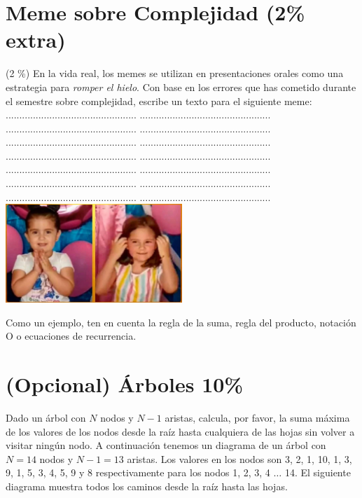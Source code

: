 \documentclass[10 pt]{article}
\begin{document}
\section{Meme sobre Complejidad (2\% extra)}
 (2 \%)  En la vida real, los memes se utilizan en presentaciones orales como una estrategia para \textit{romper el hielo}. Con base en los errores que has cometido durante el semestre sobre complejidad, 
escribe un texto para el siguiente meme:\\
................................................     ................................................\\
................................................     ................................................\\
................................................     ................................................\\
................................................     ................................................\\
................................................     ................................................\\
................................................     ................................................\\
................................................     ................................................\\
\includegraphics[width=0.5\textwidth]{Meme.jpg}


Como un ejemplo, ten en cuenta la regla de la suma, regla del producto,
notación O o ecuaciones de recurrencia.



\newpage


\section{(Opcional) Árboles 10\%}

Dado un árbol con $N$ nodos y $N-1$ aristas, calcula, por favor, la suma máxima de los valores de los nodos desde la raíz hasta cualquiera de las hojas sin volver a visitar ningún nodo. A continuación tenemos un diagrama de un árbol con $N=14$ nodos y $N-1=13$ aristas. Los valores en los nodos son 3, 2, 1, 10, 1, 3, 9, 1, 5, 3, 4, 5, 9 y 8 respectivamente para los nodos 1, 2, 3, 4 $\dots$ 14. El siguiente diagrama muestra todos los caminos desde la raíz hasta las hojas.
\end{document}
